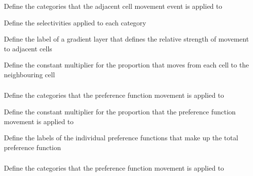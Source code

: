  {Define the categories that the adjacent cell movement event is applied to}

 {Define the selectivities applied to each category}

 {Define the label of a gradient layer that defines the relative strength of movement to adjacent cells}

 {Define the constant multiplier for the proportion that moves from each cell to the neighbouring cell}

\subsubsection[Preference movement]{}

 {Define the categories that the preference function movement is applied to}

 {Define the constant multiplier for the proportion that the preference function movement is applied to}

 {Define the labels of the individual  preference functions that make up the total preference function}

\subsubsection[Multi-threaded preference movement]{}

 {Define the categories that the preference function movement is applied to}

